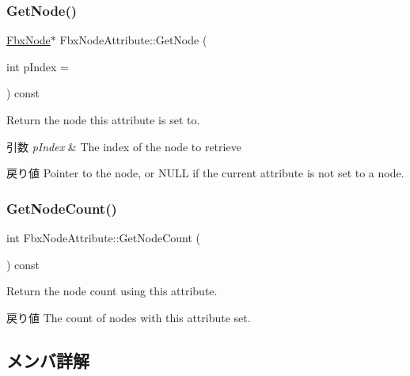 \mbox{\label{class_fbx_node_attribute_ac42128906415c993c6cb68588f9be149}} 
\subsubsection{\texorpdfstring{Get\+Node()}{GetNode()}}
{\footnotesize\ttfamily \hyperlink{class_fbx_node}{Fbx\+Node}$\ast$ Fbx\+Node\+Attribute\+::\+Get\+Node (\begin{DoxyParamCaption}\item[{int}]{p\+Index = {} }\end{DoxyParamCaption}) const}

Return the node this attribute is set to. 
\begin{DoxyParams}{引数}
{\em p\+Index} & The index of the node to retrieve \\
\hline
\end{DoxyParams}
\begin{DoxyReturn}{戻り値}
Pointer to the node, or {\ttfamily N\+U\+LL} if the current attribute is not set to a node. 
\end{DoxyReturn}
\mbox{\label{class_fbx_node_attribute_a72f38adeb0963e61bf5d156e76052370}} 
\subsubsection{\texorpdfstring{Get\+Node\+Count()}{GetNodeCount()}}
{\footnotesize\ttfamily int Fbx\+Node\+Attribute\+::\+Get\+Node\+Count (\begin{DoxyParamCaption}{ }\end{DoxyParamCaption}) const}

Return the node count using this attribute. \begin{DoxyReturn}{戻り値}
The count of nodes with this attribute set. 
\end{DoxyReturn}


\subsection{メンバ詳解}
\mbox{\label{class_fbx_node_attribute_a31f3a2361406eb670fa6ee3b5dffc864}} 

